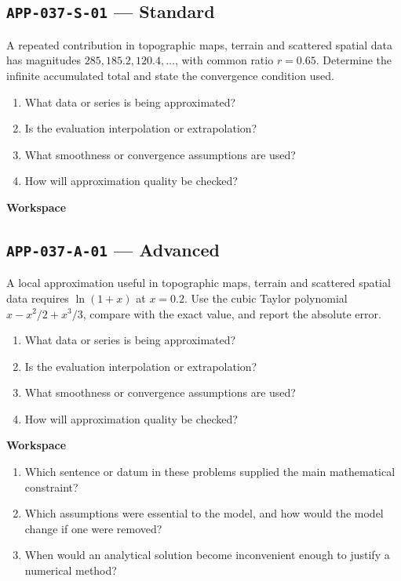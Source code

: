 \documentclass[11pt]{book}
\newcommand{\pid}[1]{\texttt{#1}}
\newcommand{\workspace}{\par\vspace{0.7in}\hrulefill\par\vspace{0.55in}\hrulefill\par}
\begin{document}
\subsection*{\pid{APP-037-S-01} — Standard}
\begin{problembox}
A repeated contribution in topographic maps, terrain and scattered spatial data has magnitudes $285, 185.2, 120.4,\ldots$, with common ratio $r=0.65$. Determine the infinite accumulated total and state the convergence condition used.
\end{problembox}
\begin{promptbox}\begin{enumerate}
\item What data or series is being approximated?
\item Is the evaluation interpolation or extrapolation?
\item What smoothness or convergence assumptions are used?
\item How will approximation quality be checked?
\end{enumerate}\end{promptbox}
\textbf{Workspace}\workspace
{}
\subsection*{\pid{APP-037-A-01} — Advanced}
\begin{problembox}
A local approximation useful in topographic maps, terrain and scattered spatial data requires $\ln(1+x)$ at $x=0.2$. Use the cubic Taylor polynomial $x-x^2/2+x^3/3$, compare with the exact value, and report the absolute error.
\end{problembox}
\begin{promptbox}\begin{enumerate}
\item What data or series is being approximated?
\item Is the evaluation interpolation or extrapolation?
\item What smoothness or convergence assumptions are used?
\item How will approximation quality be checked?
\end{enumerate}\end{promptbox}
\textbf{Workspace}\workspace
\begin{reflectionbox}\begin{enumerate}
\item Which sentence or datum in these problems supplied the main mathematical constraint?
\item Which assumptions were essential to the model, and how would the model change if one were removed?
\item When would an analytical solution become inconvenient enough to justify a numerical method?
\end{enumerate}\end{reflectionbox}
\end{document}
